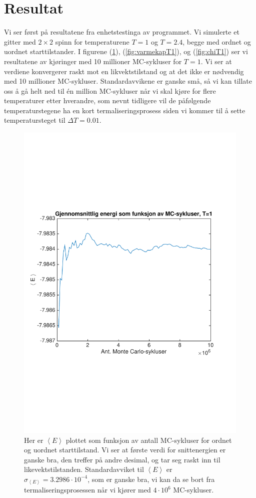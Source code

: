 \documentclass[norsk, 10pt]{article}
\def\mean#1{\left\langle #1 \right\rangle}
\begin{document}
\section*{Resultat}
Vi ser først på resultatene fra enhetstestinga av programmet. Vi simulerte et gitter med $2\times2$ spinn for temperaturene $T=1$ og $T=2.4$, begge med ordnet og uordnet starttilstander. I figurene (\ref{fig:meanET1}), (\ref{fig:varmekapT1}), og (\ref{fig:chiT1}) ser vi resultatene av kjøringer med 10 millioner MC-sykluser for $T=1$. Vi ser at verdiene konvergerer raskt mot en likvektstilstand og at det ikke er nødvendig med 10 millioner MC-sykluser. Standardavvikene er ganske små, så vi kan tillate oss å gå helt ned til én million MC-sykluser når vi skal kjøre for flere temperaturer etter hverandre, som nevnt tidligere vil de påfølgende temperaturstegene ha en kort termaliseringsprosess siden vi kommer til å sette temperatursteget til $\Delta T = 0.01$.

\begin{figure}[H]
\centering
\includegraphics[scale = 0.6, trim = 1cm 8cm 1cm 8cm]{b_avgEnergy_MC_L2_T1.pdf}
\caption{Her er $\mean E$ plottet som funksjon av antall MC-sykluser for ordnet og uordnet starttilstand. Vi ser at første verdi for snittenergien er ganske bra, den treffer på andre desimal, og tar seg raskt inn til likevektstilstanden. Standardavviket til $\mean E$ er $\sigma_{\mean E} = 3.2986\cdot10^{-4}$, som er ganske bra, vi kan da se bort fra termaliseringsprosessen når vi kjører med $4\cdot10^6$ MC-sykluser.}
\label{fig:meanET1}
\end{figure}
\end{document}
